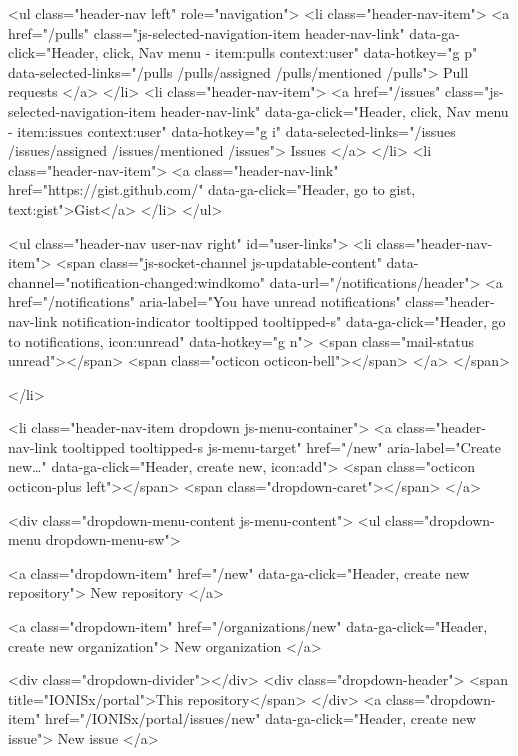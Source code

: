       <ul class="header-nav left" role="navigation">
        <li class="header-nav-item">
          <a href="/pulls" class="js-selected-navigation-item header-nav-link" data-ga-click="Header, click, Nav menu - item:pulls context:user" data-hotkey="g p" data-selected-links="/pulls /pulls/assigned /pulls/mentioned /pulls">
            Pull requests
</a>        </li>
        <li class="header-nav-item">
          <a href="/issues" class="js-selected-navigation-item header-nav-link" data-ga-click="Header, click, Nav menu - item:issues context:user" data-hotkey="g i" data-selected-links="/issues /issues/assigned /issues/mentioned /issues">
            Issues
</a>        </li>
          <li class="header-nav-item">
            <a class="header-nav-link" href="https://gist.github.com/" data-ga-click="Header, go to gist, text:gist">Gist</a>
          </li>
      </ul>

    
<ul class="header-nav user-nav right" id="user-links">
  <li class="header-nav-item">
      <span class="js-socket-channel js-updatable-content"
        data-channel="notification-changed:windkomo"
        data-url="/notifications/header">
      <a href="/notifications" aria-label="You have unread notifications" class="header-nav-link notification-indicator tooltipped tooltipped-s" data-ga-click="Header, go to notifications, icon:unread" data-hotkey="g n">
          <span class="mail-status unread"></span>
          <span class="octicon octicon-bell"></span>
</a>  </span>

  </li>

  <li class="header-nav-item dropdown js-menu-container">
    <a class="header-nav-link tooltipped tooltipped-s js-menu-target" href="/new"
       aria-label="Create new…"
       data-ga-click="Header, create new, icon:add">
      <span class="octicon octicon-plus left"></span>
      <span class="dropdown-caret"></span>
    </a>

    <div class="dropdown-menu-content js-menu-content">
      <ul class="dropdown-menu dropdown-menu-sw">
        
<a class="dropdown-item" href="/new" data-ga-click="Header, create new repository">
  New repository
</a>


  <a class="dropdown-item" href="/organizations/new" data-ga-click="Header, create new organization">
    New organization
  </a>



  <div class="dropdown-divider"></div>
  <div class="dropdown-header">
    <span title="IONISx/portal">This repository</span>
  </div>
    <a class="dropdown-item" href="/IONISx/portal/issues/new" data-ga-click="Header, create new issue">
      New issue
    </a>

